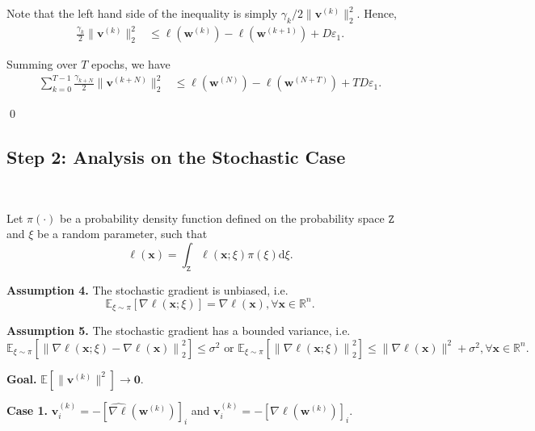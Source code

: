 \documentclass[10pt,a4paper]{article}
\begin{document}
Note that the left hand side of the inequality is simply $\gamma_k/2 \lVert \mathbf{v}^{(k)}\rVert_2^2$. Hence,
\begin{align*}
  \frac{\gamma_k}{2} \lVert \mathbf{v}^{(k)}\rVert_2^2 & \leq \ell(\mathbf{w}^{(k)})-\ell(\mathbf{w}^{(k+1)})+D\varepsilon_1.
\end{align*}

Summing over $T$ epochs, we have
\begin{align*}
  \sum\limits_{k=0}^{T-1} \frac{\gamma_{k+N}}{2} \lVert \mathbf{v}^{(k+N)}\rVert_2^2 & \leq \ell(\mathbf{w}^{(N)})-\ell(\mathbf{w}^{(N+T)})+TD\varepsilon_1.
\end{align*}


\qed

\subsection{Step 2: Analysis on the Stochastic Case}\hfill\\

Let $\pi(\cdot)$ be a probability density function defined on the probability space $\mathtt{Z}$ and $\xi$ be a random parameter, such that
$$\ell(\mathbf{x})=\int_\mathtt{Z} \ell(\mathbf{x};\xi)\pi(\xi)\text{d}\xi.$$

\textbf{Assumption 4.} The stochastic gradient is unbiased, i.e. $$\mathbb{E}_{\xi\sim\pi}[\nabla\ell(\mathbf{x};\xi)]=\nabla\ell(\mathbf{x}),\forall \mathbf{x}\in \mathbb{R}^n.$$

\textbf{Assumption 5.} The stochastic gradient has a bounded variance, i.e. $$\mathbb{E}_{\xi\sim\pi}\left[\left\lVert\nabla \ell(\mathbf{x};\xi)-\nabla \ell(\mathbf{x})\right\rVert^2_2\right]\leq\sigma^2 \text{ or }\mathbb{E}_{\xi\sim\pi}\left[\left\lVert\nabla \ell(\mathbf{x};\xi)\right\rVert^2_2\right]\leq \lVert\nabla \ell(\mathbf{x})\rVert^2+\sigma^2,\forall \mathbf{x}\in \mathbb{R}^n.$$

\textbf{Goal.} $\mathbb{E}[\lVert \mathbf{v}^{(k)}\rVert^2]\to \mathbf{0}$.


\textbf{Case 1.} $\hat{\mathbf{v}}^{(k)}_i=-[\widehat{\nabla\ell}(\mathbf{w}^{(k)})]_i$ and $\mathbf{v}^{(k)}_i=-[\nabla\ell(\mathbf{w}^{(k)})]_i$.
\end{document}
